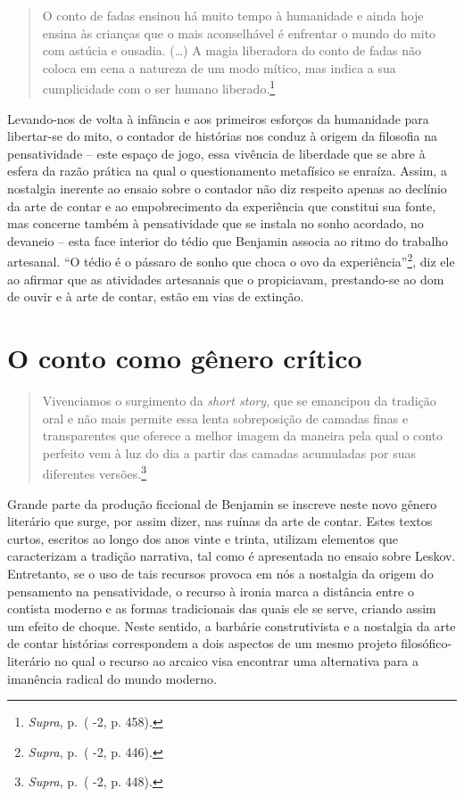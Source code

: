 \begin{quote}
O conto de fadas ensinou há muito tempo à humanidade e ainda hoje ensina
às crianças que o mais aconselhável é enfrentar o mundo do mito com
astúcia e ousadia. (\ldots{}) A magia liberadora do conto de fadas não coloca
em cena a natureza de um modo mítico, mas indica a sua cumplicidade com
o ser humano liberado.\footnote{\emph{Supra}, p.\,\pageref{supra5} ( -2, p. 458).}
\end{quote}

Levando-nos de volta à infância e aos primeiros esforços da humanidade
para libertar-se do mito, o contador de histórias nos conduz à origem da
filosofia na pensatividade -- este espaço de jogo, essa vivência de
liberdade que se abre à esfera da razão prática na qual o questionamento
metafísico se enraíza. Assim, a nostalgia inerente ao ensaio sobre o
contador não diz respeito apenas ao declínio da arte de contar e ao
empobrecimento da experiência que constitui sua fonte, mas concerne
também à pensatividade que se instala no sonho acordado, no devaneio --
esta face interior do tédio que Benjamin associa ao ritmo do trabalho
artesanal. ``O tédio é o pássaro de sonho que choca o ovo da
experiência''\footnote{\emph{Supra}, p.\,\pageref{supra6} ( -2, p. 446).}, diz ele ao
afirmar que as atividades artesanais que o propiciavam, prestando-se ao
dom de ouvir e à arte de contar, estão em vias de extinção.

\section{O conto como gênero crítico}

\begin{quote}
Vivenciamos o surgimento da \emph{short story}, que se emancipou da
tradição oral e não mais permite essa lenta sobreposição de camadas
finas e transparentes que oferece a melhor imagem da maneira pela qual o
conto perfeito vem à luz do dia a partir das camadas acumuladas por suas
diferentes versões.\footnote{\emph{Supra}, p.\,\pageref{supra7} ( -2, p. 448).}
\end{quote}

Grande parte da produção ficcional de Benjamin se inscreve neste novo
gênero literário que surge, por assim dizer, nas ruínas da arte de
contar. Estes textos curtos, escritos ao longo dos anos vinte e trinta,
utilizam elementos que caracterizam a tradição narrativa, tal como é
apresentada no ensaio sobre Leskov. Entretanto, se o uso de tais
recursos provoca em nós a nostalgia da origem do pensamento na
pensatividade, o recurso à ironia marca a distância entre o contista
moderno e as formas tradicionais das quais ele se serve, criando assim
um efeito de choque. Neste sentido, a barbárie construtivista e a
nostalgia da arte de contar histórias correspondem a dois aspectos de um
mesmo projeto filosófico-literário no qual o recurso ao arcaico visa
encontrar uma alternativa para a imanência radical do mundo moderno.

